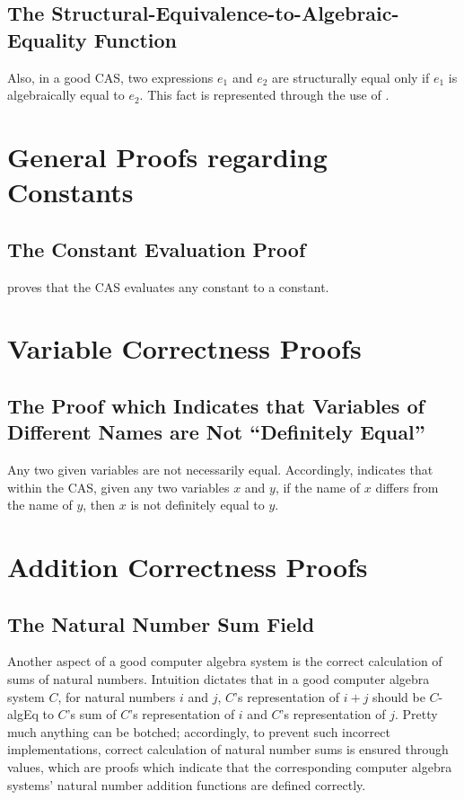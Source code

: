 \documentclass{report}
\begin{document}
\subsection{The Structural-Equivalence-to-Algebraic-Equality Function}
Also, in a good CAS, two expressions \(e_1\) and \(e_2\) are structurally equal only if \(e_1\) is algebraically equal to \(e_2\).  This fact is represented through the use of .

\section{General Proofs regarding Constants}

\subsection{The Constant Evaluation Proof}
  proves that the  CAS evaluates any constant to a constant.

\section{Variable Correctness Proofs}

\subsection{The Proof which Indicates that Variables of Different Names are Not ``Definitely Equal''}
Any two given variables are not necessarily equal.  Accordingly,   indicates that within the  CAS, given any two  variables \(x\) and \(y\), if the name of \(x\) differs from the name of \(y\), then \(x\) is not definitely equal to \(y\).

\section{Addition Correctness Proofs}

\subsection{The Natural Number Sum Field}
Another aspect of a good computer algebra system is the correct calculation of sums of natural numbers.  Intuition dictates that in a good computer algebra system \(C\), for natural numbers \(i\) and \(j\), \(C\)'s representation of \(i + j\) should be \(C\)-\gls{algEq} to \(C\)'s sum of \(C\)'s representation of \(i\) and \(C\)'s representation of \(j\).  Pretty much anything can be botched; accordingly, to prevent such incorrect implementations, correct calculation of natural number sums is ensured through  values, which are proofs which indicate that the corresponding computer algebra systems' natural number addition functions are defined correctly.
\end{document}
